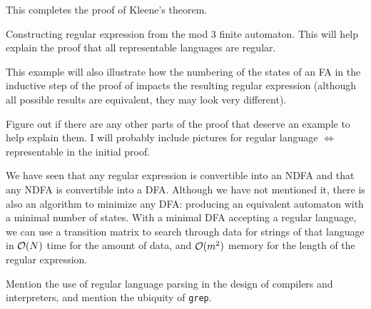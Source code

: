 \documentclass{bcthesis}
\renewcommand{\meo}{}
\begin{document}
	This completes the proof of Kleene's theorem.



\label{sec:examples}

	\begin{example}
		Constructing regular expression from the mod 3 finite automaton.
		This will help explain the proof that all representable languages are regular.

		This example will also illustrate how the numbering of the states of an FA in the inductive step of the proof of  impacts the resulting regular expression (although all possible results are equivalent, they may look very different).
	\end{example}

	\meo{
		Figure out if there are any other parts of the proof that deserve an example to help explain them.
		I will probably include pictures for regular language $\iff$ representable in the initial proof.
	}


\label{sec:motivation}
	\begin{remark}
		We have seen that any regular expression is convertible into an NDFA and that any NDFA is convertible into a DFA.
		Although we have not mentioned it, there is also an algorithm to minimize any DFA: producing an equivalent automaton with a minimal number of states. 
		With a minimal DFA accepting a regular language, we can use a transition matrix to search through data for strings of that language in $\mathcal{O}(N)$ time for the amount of data, and $\mathcal{O}(m^2)$ memory for the length of the regular expression.
	\end{remark}

	\begin{remark}
		Mention the use of regular language parsing in the design of compilers and interpreters, and mention the ubiquity of \texttt{grep}.
	\end{remark}



\iffalse
\mychapter{Mathematical Notation}%
\label{ch:mathematical-notation}

You may find it useful to the reader to provide a table of notation. 

\mychapter{Conclusion(s)}
\label{ch:conclusion}
\fi
\end{document}
